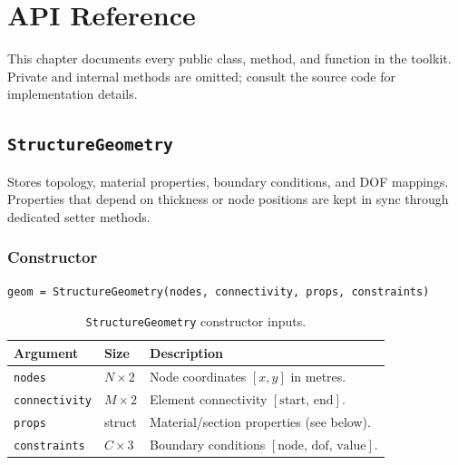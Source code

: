 \chapter{API Reference}
\label{ch:api}

This chapter documents every public class, method, and function in the
toolkit.  Private and internal methods are omitted; consult the source code
for implementation details.

\section{\texttt{StructureGeometry}}
\label{sec:api:geometry}

Stores topology, material properties, boundary conditions, and DOF mappings.
Properties that depend on thickness or node positions are kept in sync through
dedicated setter methods.

\subsection{Constructor}

\begin{lstlisting}
geom = StructureGeometry(nodes, connectivity, props, constraints)
\end{lstlisting}

\begin{table}[H]
\centering
\caption{\texttt{StructureGeometry} constructor inputs.}
\begin{tabularx}{\textwidth}{llX}
\toprule
\textbf{Argument} & \textbf{Size} & \textbf{Description} \\
\midrule
\texttt{nodes}        & $N\times2$  & Node coordinates $[x,y]$ in metres. \\
\texttt{connectivity} & $M\times2$  & Element connectivity $[\text{start},\,\text{end}]$. \\
\texttt{props}        & struct      & Material/section properties (see below). \\
\texttt{constraints}  & $C\times3$  & Boundary conditions $[\text{node},\,\text{dof},\,\text{value}]$. \\
\bottomrule
\end{tabularx}
\end{table}

